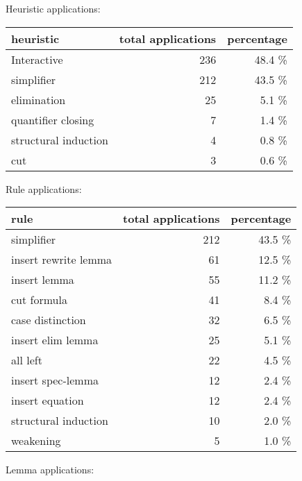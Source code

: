 \documentclass[a4paper]{article}
\begin{document}
Heuristic applications:

\begin{supertabular}{l|r|r}
heuristic	& total applications & percentage \\ \hline
Interactive & 236 & 48.4 \% \\
simplifier & 212 & 43.5 \% \\
elimination & 25 & 5.1 \% \\
quantifier closing & 7 & 1.4 \% \\
structural induction & 4 & 0.8 \% \\
cut & 3 & 0.6 \% \\

\end{supertabular}

Rule applications:

\begin{supertabular}{l|r|r}
rule	        & total applications & percentage \\ \hline
simplifier & 212 & 43.5 \% \\
insert rewrite lemma & 61 & 12.5 \% \\
insert lemma & 55 & 11.2 \% \\
cut formula & 41 & 8.4 \% \\
case distinction & 32 & 6.5 \% \\
insert elim lemma & 25 & 5.1 \% \\
all left & 22 & 4.5 \% \\
insert spec-lemma & 12 & 2.4 \% \\
insert equation & 12 & 2.4 \% \\
structural induction & 10 & 2.0 \% \\
weakening & 5 & 1.0 \% \\

\end{supertabular}

Lemma applications:
\end{document}
